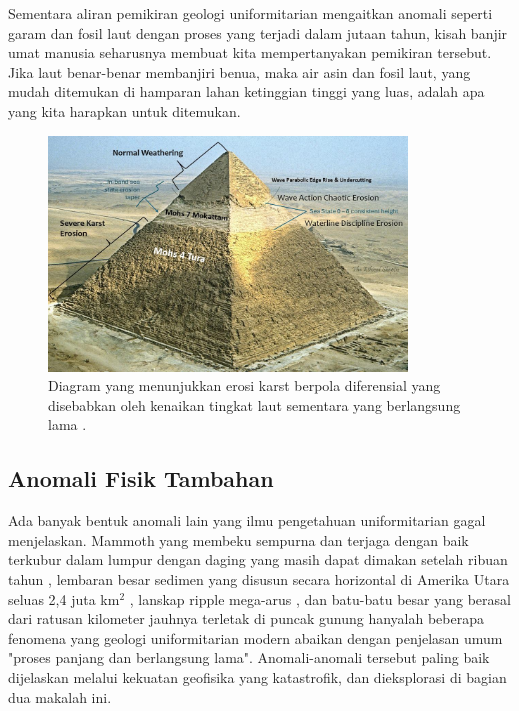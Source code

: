 \documentclass[10pt,twocolumn,letterpaper]{article}
\begin{document}
Sementara aliran pemikiran geologi uniformitarian mengaitkan anomali seperti garam dan fosil laut dengan proses yang terjadi dalam jutaan tahun, kisah banjir umat manusia seharusnya membuat kita mempertanyakan pemikiran tersebut. Jika laut benar-benar membanjiri benua, maka air asin dan fosil laut, yang mudah ditemukan di hamparan lahan ketinggian tinggi yang luas, adalah apa yang kita harapkan untuk ditemukan.

\begin{figure}[t]
\begin{center}
\includegraphics[width=0.85\textwidth]{khafre.jpg}
\end{center}
   \caption{Diagram yang menunjukkan erosi karst berpola diferensial yang disebabkan oleh kenaikan tingkat laut sementara yang berlangsung lama \cite{27}.}
\label{fig:4}
\end{figure}

\subsection{Anomali Fisik Tambahan}

Ada banyak bentuk anomali lain yang ilmu pengetahuan uniformitarian gagal menjelaskan. Mammoth yang membeku sempurna dan terjaga dengan baik terkubur dalam lumpur dengan daging yang masih dapat dimakan setelah ribuan tahun \cite{17,18,19}, lembaran besar sedimen yang disusun secara horizontal di Amerika Utara seluas 2,4 juta km$^2$ \cite{21}, lanskap ripple mega-arus \cite{22}, dan batu-batu besar yang berasal dari ratusan kilometer jauhnya terletak di puncak gunung \cite{23,26} hanyalah beberapa fenomena yang geologi uniformitarian modern abaikan dengan penjelasan umum "proses panjang dan berlangsung lama". Anomali-anomali tersebut paling baik dijelaskan melalui kekuatan geofisika yang katastrofik, dan dieksplorasi di bagian dua makalah ini.
\end{document}
